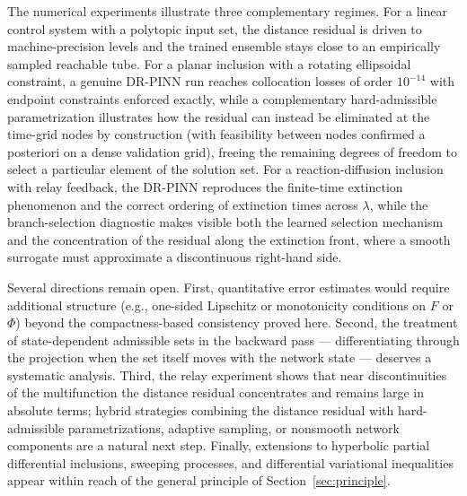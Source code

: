 \documentclass[11pt]{elsarticle}
\theoremstyle{definition}
\theoremstyle{remark}
\numberwithin{equation}{section}
\begin{document}
The numerical experiments illustrate three complementary regimes. For a
linear control system with a polytopic input set, the distance residual
is driven to machine-precision levels and the trained ensemble stays
close to an empirically sampled reachable tube. For a planar inclusion
with a rotating ellipsoidal constraint, a genuine DR-PINN run reaches
collocation losses of order $10^{-14}$ with endpoint constraints enforced
exactly, while a complementary hard-admissible parametrization
illustrates how the residual can instead be eliminated at the time-grid
nodes by construction (with feasibility between nodes confirmed a
posteriori on a dense validation grid), freeing the remaining degrees of freedom to
select a particular element of the solution set. For a reaction-diffusion
inclusion with relay feedback, the DR-PINN reproduces the finite-time
extinction phenomenon and the correct ordering of extinction times across
$\lambda$, while the branch-selection diagnostic makes visible both the
learned selection mechanism and the concentration of the residual along
the extinction front, where a smooth surrogate must approximate a
discontinuous right-hand side.

Several directions remain open. First, quantitative error estimates
would require additional structure (e.g., one-sided Lipschitz or
monotonicity conditions on $F$ or $\Phi$) beyond the compactness-based
consistency proved here. Second, the treatment of state-dependent
admissible sets in the backward pass --- differentiating through the
projection when the set itself moves with the network state --- deserves
a systematic analysis. Third, the relay experiment shows that near
discontinuities of the multifunction the distance residual concentrates
and remains large in absolute terms; hybrid strategies combining the
distance residual with hard-admissible parametrizations, adaptive
sampling, or nonsmooth network components are a natural next step.
Finally, extensions to hyperbolic partial differential inclusions,
sweeping processes, and differential variational inequalities appear
within reach of the general principle of Section~\ref{sec:principle}.



%


\end{document}
